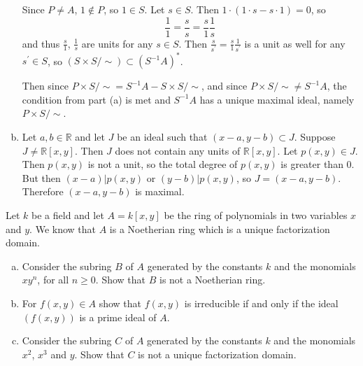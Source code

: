 \documentclass{article}
\newcounter{Problem}
\newenvironment{Problem}{\begin{Exercise}[name={Problem},
                                          counter={Problem}]}
                        {\end{Exercise}}
\begin{document}
\begin{Answer}
\begin{enumerate}[(a)]
{      Since $P \neq A$, $1 \notin P$, so $1 \in S$.
      Let $s \in S$. Then $1 \cdot (1 \cdot s - s \cdot 1) = 0$, so
       $$
       \frac{1}{1} = \frac{s}{s} = \frac{s}{1}\frac{1}{s}
       $$
      and thus $\frac{s}{1}$, $\frac{1}{s}$ are units for any $s \in
      S$. Then
      $
      \frac{s}{s^\prime} = \frac{s}{1}\frac{1}{s^\prime}
      $
      is a unit as well for any $s^\prime \in S$, so
      $(S \times S / \sim) \subset (S^{-1}A)^\ast$.

      Then since $P \times S / \sim = S^{-1} A - S \times S / \sim$,
      and since $P \times S / \sim \neq S^{-1} A$, the condition from
      part (a) is met and $S^{-1} A$ has a unique maximal ideal, namely
      $P \times S / \sim$.
    }
    \item{
      Let $a, b \in \mathbb{R}$ and let $J$ be an ideal such that
      $(x - a, y - b) \subset J$. Suppose $J \neq \mathbb{R}[x,y]$.
      Then $J$ does not contain any units of $\mathbb{R}[x,y]$.
      Let $p(x,y) \in J$. Then $p(x,y)$ is not a unit, so
      the total degree of $p(x,y)$ is greater than 0. But then
      $(x - a) \vert p(x,y)$ or $(y - b) \vert p(x,y)$, so
      $J = (x - a, y - b)$. Therefore $(x - a, y - b)$ is maximal.
    }
  \end{enumerate}
\end{Answer}

\pagebreak

\begin{Problem}
  Let $k$ be a field and let $A = k[x, y]$ be the ring of polynomials in
  two variables $x$ and $y$. We know that $A$ is a Noetherian ring which
  is a unique factorization domain.
  \begin{enumerate}[(a)]
    \item{
      Consider the subring $B$ of $A$ generated by the constants $k$
      and the monomials $xy^n$, for all $n \geq 0$. Show that $B$ is
      not a Noetherian ring.
    }
    \item{
      For $f(x, y) \in A$ show that $f(x, y)$ is irreducible if and
      only if the ideal $(f(x,y))$ is a prime ideal of $A$.
    }
    \item{
      Consider the subring $C$ of $A$ generated by the constants $k$
      and the monomials $x^2$, $x^3$ and $y$. Show that $C$ is not a
      unique factorization domain.
    }
  \end{enumerate}
\end{Problem}
\end{document}
